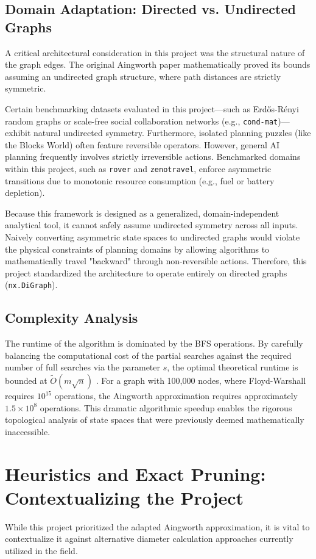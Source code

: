 \subsection{Domain Adaptation: Directed vs. Undirected Graphs}
A critical architectural consideration in this project was the structural nature of the graph edges. The original Aingworth paper mathematically proved its bounds assuming an undirected graph structure, where path distances are strictly symmetric. 

Certain benchmarking datasets evaluated in this project—such as Erdős-Rényi random graphs or scale-free social collaboration networks (e.g., \texttt{cond-mat})—exhibit natural undirected symmetry. Furthermore, isolated planning puzzles (like the Blocks World) often feature reversible operators. However, general AI planning frequently involves strictly irreversible actions. Benchmarked domains within this project, such as \texttt{rover} and \texttt{zenotravel}, enforce asymmetric transitions due to monotonic resource consumption (e.g., fuel or battery depletion). 

Because this framework is designed as a generalized, domain-independent analytical tool, it cannot safely assume undirected symmetry across all inputs. Naively converting asymmetric state spaces to undirected graphs would violate the physical constraints of planning domains by allowing algorithms to mathematically travel "backward" through non-reversible actions. Therefore, this project standardized the architecture to operate entirely on directed graphs (\texttt{nx.DiGraph}).

\subsection{Complexity Analysis}
The runtime of the algorithm is dominated by the BFS operations. By carefully balancing the computational cost of the partial searches against the required number of full searches via the parameter $s$, the optimal theoretical runtime is bounded at $\tilde{O}(m\sqrt{n})$ \cite{aingworth96}. For a graph with 100,000 nodes, where Floyd-Warshall requires $10^{15}$ operations, the Aingworth approximation requires approximately $1.5 \times 10^8$ operations. This dramatic algorithmic speedup enables the rigorous topological analysis of state spaces that were previously deemed mathematically inaccessible.

\section{Heuristics and Exact Pruning: Contextualizing the Project}
While this project prioritized the adapted Aingworth approximation, it is vital to contextualize it against alternative diameter calculation approaches currently utilized in the field.

